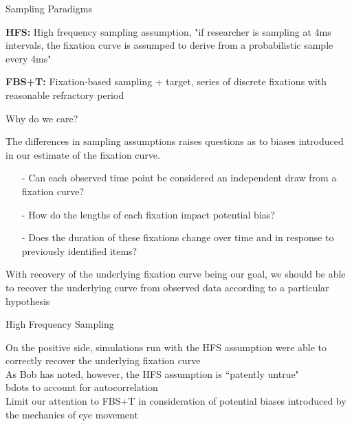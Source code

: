 \documentclass{beamer}
\begin{document}
\begin{frame}{Sampling Paradigms}

\textbf{HFS:} High frequency sampling assumption, "if researcher is sampling at 4ms intervals, the fixation curve is assumped to derive from a probabilistic sample every 4ms"  \newline 

\vspace{4mm}

\textbf{FBS+T:} Fixation-based sampling + target, series of discrete fixations with reasonable refractory period
\end{frame}

\begin{frame}{Why do we care?}

The differences in sampling assumptions raises questions as to biases introduced in our estimate of the fixation curve. \newline

\begin{itemize}
  \item[-] Can each observed time point be considered an independent draw from a fixation curve?
  \item[-] How do the lengths of each fixation impact potential bias?
  \item[-] Does the duration of these fixations change over time and in response to previously identified items?
\end{itemize}

\vspace{4mm}

With recovery of the underlying fixation curve being our goal, we should be able to recover the underlying curve from observed data according to a particular hypothesis \newline 

\end{frame}

\begin{frame}{High Frequency Sampling}

On the positive side, simulations run with the HFS assumption were able to correctly recover the underlying fixation curve \newline \\

As Bob has noted, however, the HFS assumption is ``patently untrue" \newline \\

bdots to account for autocorrelation \newline \\


Limit our attention to FBS+T in consideration of potential biases introduced by the mechanics of eye movement

\end{frame}
\end{document}
